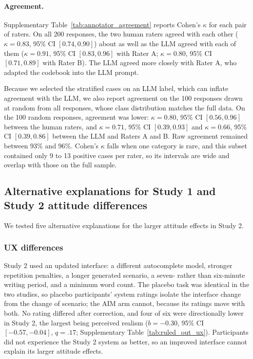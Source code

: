 \documentclass[11pt]{article}
\begin{document}
\paragraph{Agreement.} Supplementary Table~\ref{tab:annotator_agreement} reports Cohen's $\kappa$ for each pair of raters. On all 200 responses, the two human raters agreed with each other ($\kappa=0.83$, 95\% CI $[0.74, 0.90]$) about as well as the LLM agreed with each of them ($\kappa=0.91$, 95\% CI $[0.83, 0.96]$ with Rater A; $\kappa=0.80$, 95\% CI $[0.71, 0.89]$ with Rater B). The LLM agreed more closely with Rater A, who adapted the codebook into the LLM prompt.


Because we selected the stratified cases on an LLM label, which can inflate agreement with the LLM, we also report agreement on the 100 responses drawn at random from all responses, whose class distribution matches the full data. On the 100 random responses, agreement was lower: $\kappa=0.80$, 95\% CI $[0.56, 0.96]$ between the human raters, and $\kappa=0.71$, 95\% CI $[0.39, 0.93]$ and $\kappa=0.66$, 95\% CI $[0.39, 0.86]$ between the LLM and Raters A and B. Raw agreement remained between 93\% and 96\%. Cohen's $\kappa$ falls when one category is rare, and this subset contained only 9 to 13 positive cases per rater, so its intervals are wide and overlap with those on the full sample.



{\footnotesize

}




\subsection{Alternative explanations for Study 1 and Study 2 attitude differences}
\label{sec:si-attitude-explanations}

We tested five alternative explanations for the larger attitude effects in Study 2.

\subsubsection{UX differences}
\label{sec:si-ux-differences}

Study 2 used an updated interface: a different autocomplete model, stronger repetition penalties, a longer generated scenario, a seven- rather than six-minute writing period, and a minimum word count. The placebo task was identical in the two studies, so placebo participants' system ratings isolate the interface change from the change of scenario; the AIM arm cannot, because its ratings move with both. No rating differed after correction, and four of six were directionally lower in Study 2, the largest being perceived realism ($b=-0.30$, 95\% CI $[-0.57,-0.04]$, $q=.17$; Supplementary Table~\ref{tab:ruled_out_ux}). Participants did not experience the Study 2 system as better, so an improved interface cannot explain its larger attitude effects.
\end{document}
